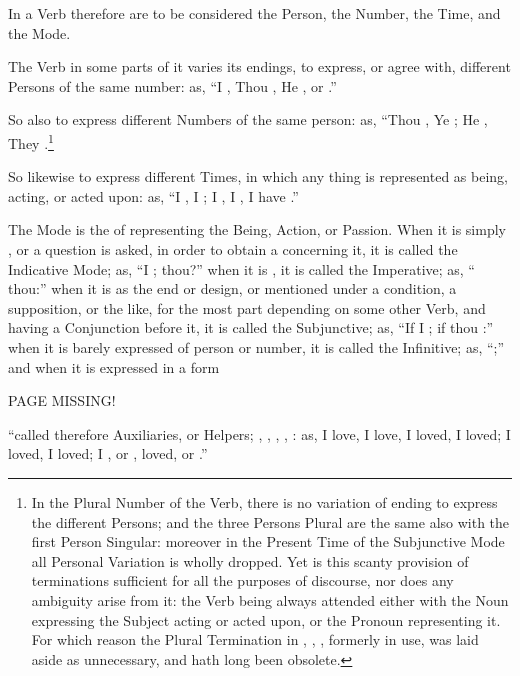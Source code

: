 In a Verb therefore are to be considered the Person, the Number, the
Time, and the Mode.

The Verb in some parts of it varies its endings, to express, or agree
with, different Persons of the same number: as, ``I , Thou
, He , or .''

So also to express different Numbers of the same person: as, ``Thou
, Ye ; He , They .\footnote{In
  the Plural Number of the Verb, there is no variation of ending to
  express the different Persons; and the three Persons Plural are the
  same also with the first Person Singular: moreover in the Present Time
  of the Subjunctive Mode all Personal Variation is wholly dropped. Yet
  is this scanty provision of terminations sufficient for all the
  purposes of discourse, nor does any ambiguity arise from it: the Verb
  being always attended either with the Noun expressing the Subject
  acting or acted upon, or the Pronoun representing it. For which reason
  the Plural Termination in , , ,
  formerly in use, was laid aside as unnecessary, and hath long been
  obsolete.}

So likewise to express different Times, in which any thing is
represented as being, acting, or acted upon: as, ``I , I
; I , I , I have .''

The Mode is the  of representing the Being, Action, or
Passion. When it is simply , or a question is asked, in
order to obtain a  concerning it, it is called the
Indicative Mode; as, ``I ;  thou?'' when it is
, it is called the Imperative; as, `` thou:'' when
it is  as the end or design, or mentioned under a
condition, a supposition, or the like, for the most part depending on
some other Verb, and having a Conjunction before it, it is called the
Subjunctive; as, ``If I ; if thou :'' when it is
barely expressed  of person or number, it is
called the Infinitive; as, ``;'' and when it is expressed in
a form

PAGE MISSING!

``called therefore Auxiliaries, or Helpers; , , ,
, : as, I  love, I  love, I 
loved, I  loved; I  loved, I  loved; I
, or , loved, or .''

